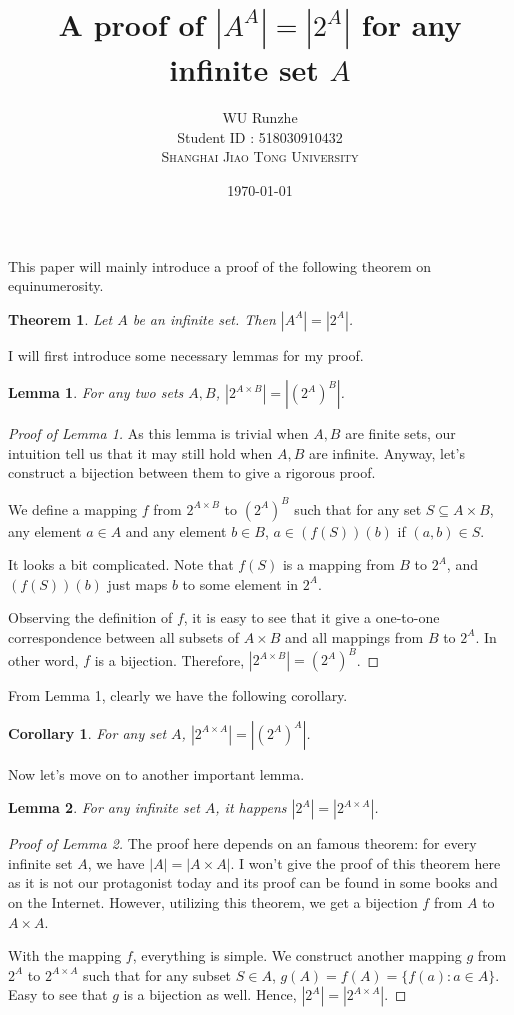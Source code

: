 \documentclass[12pt]{article}
\title{A proof of $|A^A|=|2^A|$ for any infinite set $A$}
\author{WU Runzhe\\
	Student ID : 518030910432\\
	\textsc{Shanghai Jiao Tong University}}
\date{\today}
\newtheorem{lemma}{Lemma}
\newtheorem{theorem}{Theorem}
\newtheorem{corollary}{Corollary}
\begin{document}
\maketitle

This paper will mainly introduce a proof of the following theorem on equinumerosity.

\begin{theorem}
	Let $A$ be an infinite set. Then $|A^A|=|2^A|$.
\end{theorem}

I will first introduce some necessary lemmas for my proof. 

\begin{lemma}
	For any two sets $A, B$, $|2^{A\times B}|=|(2^A)^B|$.
\end{lemma}

\begin{proof}[Proof of Lemma 1]
	As this lemma is trivial when $A,B$ are finite sets, our intuition tell us that it may still hold when $A,B$ are infinite. Anyway, let's construct a bijection between them to give a rigorous proof.

	We define a mapping $f$ from $2^{A\times B}$ to $(2^A)^B$ such that for any set $S\subseteq A\times B$, any element $a\in A$ and any element $b\in B$, $a\in(f(S))(b)$ if $(a,b)\in S$. 
	
	It looks a bit complicated. Note that $f(S)$ is a mapping from $B$ to $2^A$, and $(f(S))(b)$ just maps $b$ to some element in $2^A$.
	
	Observing the definition of $f$, it is easy to see that it give a one-to-one correspondence between all subsets of $A\times B$ and all mappings from $B$ to $2^A$. In other word, $f$ is a bijection. Therefore, $|2^{A\times B}|=(2^A)^B$.
	
\end{proof}

From Lemma 1, clearly we have the following corollary.

\begin{corollary}
	For any set $A$, $|2^{A\times A}|=|(2^A)^A|$.
\end{corollary}

Now let's move on to another important lemma.

\begin{lemma}
	For any infinite set $A$, it happens $|2^A|=|2^{A\times A}|$.
\end{lemma}

\begin{proof}[Proof of Lemma 2]
	
	The proof here depends on an famous theorem: for every infinite set $A$, we have $|A|=|A\times A|$. I won't give the proof of this theorem here as it is not our protagonist today and its proof can be found in some books and on the Internet. However, utilizing this theorem, we get a bijection $f$ from $A$ to $A\times A$.
	
	With the mapping $f$, everything is simple. We construct another mapping $g$ from $2^A$ to $2^{A\times A}$ such that for any subset $S\in A$, $g(A)=f(A)=\{f(a):a\in A\}$. Easy to see that $g$ is a bijection as well. Hence, $|2^A|=|2^{A\times A}|$.
	
\end{proof}
\end{document}
